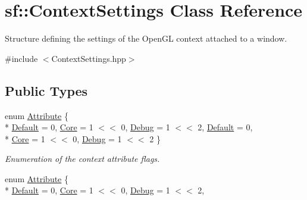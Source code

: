 \hypertarget{structsf_1_1_context_settings}{\section{sf\-:\-:Context\-Settings Class Reference}
\label{structsf_1_1_context_settings}
}


Structure defining the settings of the Open\-G\-L context attached to a window.  




{\ttfamily \#include $<$Context\-Settings.\-hpp$>$}

\subsection*{Public Types}
\begin{DoxyCompactItemize}
\item 
enum \hyperlink{structsf_1_1_context_settings_af2e91e57e8d26c40afe2ec8efaa32a2c}{Attribute} \{ \\*
\hyperlink{structsf_1_1_context_settings_af2e91e57e8d26c40afe2ec8efaa32a2ca0246d0341f162d5bd17d3c22d1bf8be1}{Default} = 0, 
\hyperlink{structsf_1_1_context_settings_af2e91e57e8d26c40afe2ec8efaa32a2cae9f568c99438d04da1f8d393efa3a3a4}{Core} = 1 $<$$<$ 0, 
\hyperlink{structsf_1_1_context_settings_af2e91e57e8d26c40afe2ec8efaa32a2ca84963e2e2ec85ef4067c210ed0381295}{Debug} = 1 $<$$<$ 2, 
\hyperlink{structsf_1_1_context_settings_af2e91e57e8d26c40afe2ec8efaa32a2ca0246d0341f162d5bd17d3c22d1bf8be1}{Default} = 0, 
\\*
\hyperlink{structsf_1_1_context_settings_af2e91e57e8d26c40afe2ec8efaa32a2cae9f568c99438d04da1f8d393efa3a3a4}{Core} = 1 $<$$<$ 0, 
\hyperlink{structsf_1_1_context_settings_af2e91e57e8d26c40afe2ec8efaa32a2ca84963e2e2ec85ef4067c210ed0381295}{Debug} = 1 $<$$<$ 2
 \}
\begin{DoxyCompactList}\small\item\em Enumeration of the context attribute flags. \end{DoxyCompactList}\item 
enum \hyperlink{structsf_1_1_context_settings_af2e91e57e8d26c40afe2ec8efaa32a2c}{Attribute} \{ \\*
\hyperlink{structsf_1_1_context_settings_af2e91e57e8d26c40afe2ec8efaa32a2ca0246d0341f162d5bd17d3c22d1bf8be1}{Default} = 0, 
\hyperlink{structsf_1_1_context_settings_af2e91e57e8d26c40afe2ec8efaa32a2cae9f568c99438d04da1f8d393efa3a3a4}{Core} = 1 $<$$<$ 0, 
\hyperlink{structsf_1_1_context_settings_af2e91e57e8d26c40afe2ec8efaa32a2ca84963e2e2ec85ef4067c210ed0381295}{Debug} = 1 $<$$<$ 2, 

\end{DoxyCompactItemize}

